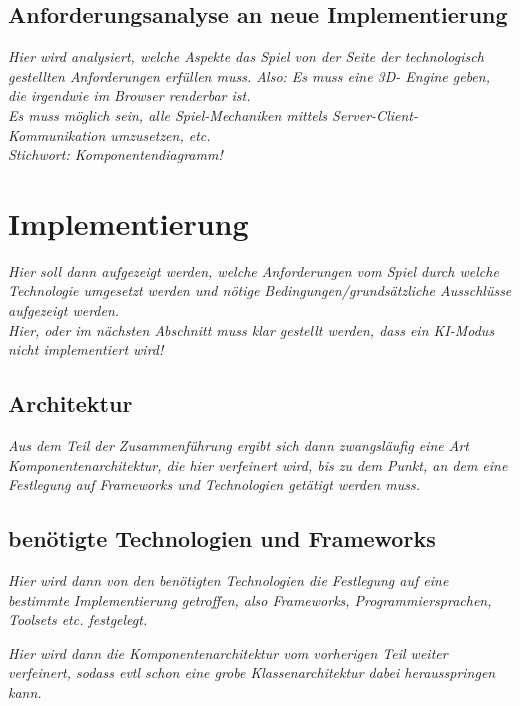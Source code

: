 \subsection{Anforderungsanalyse an neue Implementierung}
\label{subsec:neueImpl_analyse}

\emph{Hier wird analysiert, welche Aspekte das Spiel von der Seite der technologisch gestellten Anforderungen erfüllen muss. Also: Es muss eine 3D- Engine geben, die irgendwie im Browser renderbar ist.\\ Es muss möglich sein, alle Spiel-Mechaniken mittels Server-Client-Kommunikation umzusetzen, etc.\\Stichwort: Komponentendiagramm!}

\section{Implementierung}
\label{sec:Umsetzung}

\emph{Hier soll dann aufgezeigt werden, welche Anforderungen vom Spiel durch welche Technologie umgesetzt werden und nötige Bedingungen/grundsätzliche Ausschlüsse aufgezeigt werden.\\Hier, oder im nächsten Abschnitt muss klar gestellt werden, dass ein KI-Modus nicht implementiert wird!}

\subsection{Architektur}
\label{subsec:Architektur}

\emph{Aus dem Teil der Zusammenführung ergibt sich dann zwangsläufig eine Art Komponentenarchitektur, die hier verfeinert wird, bis zu dem Punkt, an dem eine Festlegung auf Frameworks und Technologien getätigt werden muss.}

\subsection{benötigte Technologien und Frameworks}
\label{subsec:Technologien}

\emph{Hier wird dann von den benötigten Technologien die Festlegung auf eine bestimmte Implementierung getroffen, also Frameworks, Programmiersprachen, Toolsets etc. festgelegt.}


\emph{Hier wird dann die Komponentenarchitektur vom vorherigen Teil weiter verfeinert, sodass evtl schon eine grobe Klassenarchitektur dabei herausspringen kann.}

